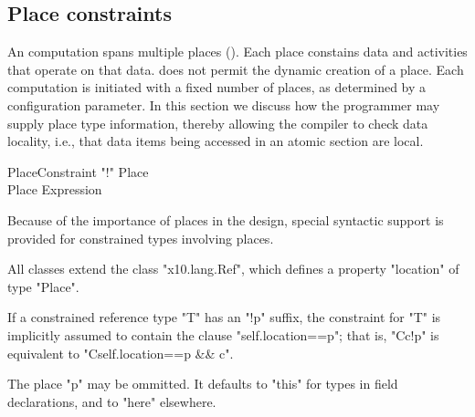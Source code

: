 \subsection{Place constraints}
\label{PlaceTypes}
\label{PlaceType}
\label{DepType:PlaceType}

An \Xten{} computation spans multiple places
(). Each place constains data and activities that
operate on that data.  \XtenCurrVer{} does not permit the dynamic
creation of a place. Each \Xten{} computation is initiated with a
fixed number of places, as determined by a configuration parameter.
In this section we discuss how the programmer may supply place type
information, thereby allowing the compiler to check data locality,
i.e., that data items being accessed in an atomic section are local.

\begin{grammar}
PlaceConstraint     \: \xcd"!" Place\opt \\
Place              \:   Expression \\
\end{grammar}

Because of the importance of places in the \Xten{} design, special
syntactic support is provided for constrained types involving places.

All \Xten{} classes extend the class
\xcd"x10.lang.Ref", which defines a property
\xcd"location" of type
\xcd"Place".

If a constrained reference type \xcd"T" has an \xcd"!p" suffix,
the constraint for \xcd"T" is implicitly assumed to contain the clause
\xcd"self.location==p"; that is,
\xcd"C{c}!p" is equivalent to \xcd"C{self.location==p && c}".

The place \xcd"p" may be ommitted. It defaults to \xcd"this" 
for types in field declarations, and to \xcd"here" elsewhere.





